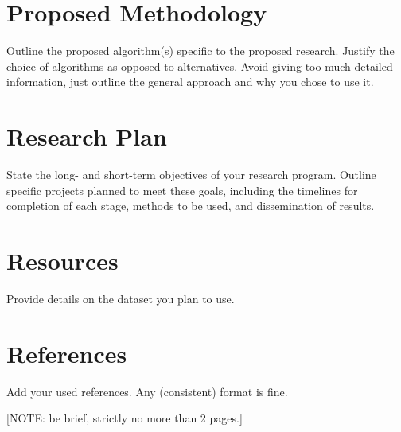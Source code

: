 \documentclass{IEEEtran}
\begin{document}
\section{Proposed Methodology}

Outline the proposed algorithm(s) specific to the proposed research. Justify the choice of algorithms as opposed to alternatives. Avoid giving too much detailed information, just outline the general approach and why you chose to use it.

\section{Research Plan}

State the long- and short-term objectives of your research program. Outline specific projects planned to meet these goals, including the timelines for completion of each stage, methods to be used, and dissemination of results. 

\section{Resources}

Provide details on the dataset you plan to use.

\section{References}

Add your used references. Any (consistent) format is fine.

\vspace{2cm}

[NOTE: be brief, strictly no more than 2 pages.]
\end{document}
